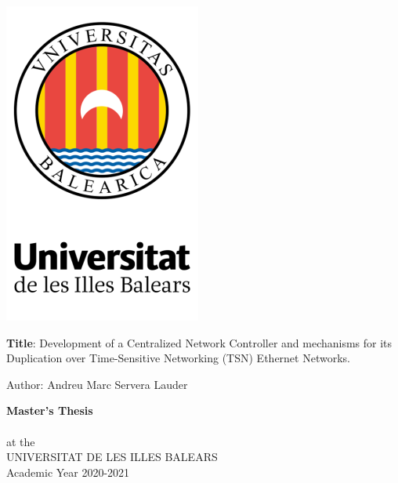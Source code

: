 \onecolumn
\begin{center}


\vspace*{1cm}
\includegraphics[scale=1]{figures/logo.png}

\vspace*{2.2cm}
\LARGE {\textbf{Title}: Development of a Centralized Network Controller and mechanisms for its Duplication over Time-Sensitive Networking (TSN) Ethernet Networks.} \\
\vspace*{1cm}

\noindent \Large{Author: Andreu Marc Servera Lauder\\}
\vspace*{1.5cm}

\noindent \large \textbf{Master's Thesis} \\
\vspace*{0.5cm}
 \\
\noindent \large {at the} \\
\noindent \large {UNIVERSITAT DE LES ILLES BALEARS} \\
\vspace*{0.5cm}
\noindent \large {Academic Year 2020-2021} \\
\vspace*{1cm}


\end{center}
